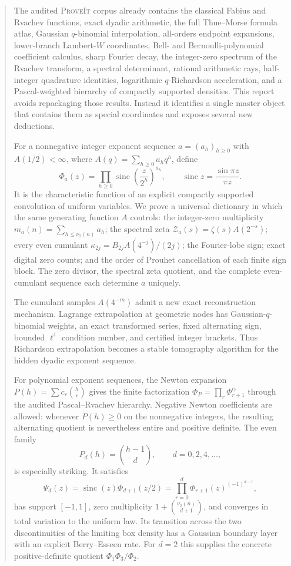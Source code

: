\documentclass[11pt,oneside]{article}
\numberwithin{equation}{section}
\theoremstyle{definition}
\theoremstyle{remark}
\newcommand{\sinc}{\operatorname{sinc}}
\newcommand{\repo}{\textsc{ProveIt}}
\begin{document}
\begin{abstract}
The audited \repo{} corpus already contains the classical Fabius and Rvachev functions,
exact dyadic arithmetic, the full Thue--Morse formula atlas, Gaussian $q$-binomial
interpolation, all-orders endpoint expansions, lower-branch Lambert-$W$ coordinates,
Bell- and Bernoulli-polynomial coefficient calculus, sharp Fourier decay, the integer-zero
spectrum of the Rvachev transform, a spectral determinant, rational arithmetic rays,
half-integer quadrature identities, logarithmic $q$-Richardson acceleration, and a
Pascal-weighted hierarchy of compactly supported densities.  This report avoids repackaging
those results.  Instead it identifies a single master object that contains them as special
coordinates and exposes several new deductions.

For a nonnegative integer exponent sequence $a=(a_h)_{h\ge0}$ with
$A(1/2)<\infty$, where $A(q)=\sum_{h\ge0}a_hq^h$, define
\[
 \Phi_a(z)=\prod_{h\ge0}\sinc\!\left(\frac{z}{2^h}\right)^{a_h},
 \qquad \sinc z=\frac{\sin\pi z}{\pi z}.
\]
It is the characteristic function of an explicit compactly supported convolution of
uniform variables.  We prove a universal dictionary in which the same generating function
$A$ controls: the integer-zero multiplicity
$m_a(n)=\sum_{h\le\nu_2(n)}a_h$; the spectral zeta
$\mathcal Z_a(s)=\zeta(s)A(2^{-s})$; every even cumulant
$\kappa_{2j}=B_{2j}A(4^{-j})/(2j)$; the Fourier-lobe sign; exact digital zero counts;
and the order of Prouhet cancellation of each finite sign block.  The zero divisor, the
spectral zeta quotient, and the complete even-cumulant sequence each determine $a$ uniquely.

The cumulant samples $A(4^{-m})$ admit a new exact reconstruction mechanism.  Lagrange
extrapolation at geometric nodes has Gaussian-$q$-binomial weights, an exact transformed
series, fixed alternating sign, bounded $\ell^1$ condition number, and certified integer
brackets.  Thus Richardson extrapolation becomes a stable tomography algorithm for the
hidden dyadic exponent sequence.

For polynomial exponent sequences, the Newton expansion
$P(h)=\sum c_r\binom hr$ gives the finite factorization
$\Phi_P=\prod_r\Phi_{r+1}^{c_r}$ through the audited Pascal--Rvachev hierarchy.  Negative
Newton coefficients are allowed: whenever $P(h)\ge0$ on the nonnegative integers, the
resulting alternating quotient is nevertheless entire and positive definite.  The even
family
\[
 P_d(h)=\binom{h-1}{d},\qquad d=0,2,4,\ldots,
\]
is especially striking.  It satisfies
\[
 \Psi_d(z)=\sinc(z)\Phi_{d+1}(z/2)
 =\prod_{r=0}^d\Phi_{r+1}(z)^{(-1)^{d-r}},
\]
has support $[-1,1]$, zero multiplicity
$1+\binom{\nu_2(n)}{d+1}$, and converges in total variation to the uniform law.  Its
transition across the two discontinuities of the limiting box density has a Gaussian
boundary layer with an explicit Berry--Esseen rate.  For $d=2$ this supplies the concrete
positive-definite quotient $\Phi_1\Phi_3/\Phi_2$.


\end{abstract}
\end{document}

